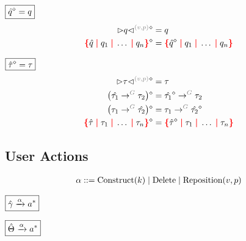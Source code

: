 \noindent $\boxed{\erase{\Z{q}} = q}$
%
\begin{align*}
  \erase{\cursor{v}{p}{q}} &= q \\
  \erase{\conflictHole{\Z{q}, q_1, \ldots, q_n}} &= \conflictHole{\erase{\Z{q}}, q_1, \ldots, q_n}
\end{align*}

\noindent $\boxed{\erase{\Z{\tau}} = \tau}$
%
\begin{align*}
  \erase{\cursor{v}{p}{\tau}} &= \tau \\
  \erase{\left(\tArrow{G}{\Z{\tau_1}}{\tau_2}\right)} &= \tArrow{G}{\erase{\Z{\tau_1}}}{\tau_2} \\
  \erase{\left(\tArrow{G}{\tau_1}{\Z{\tau_2}}\right)} &= \tArrow{G}{\tau_1}{\erase{\Z{\tau_2}}} \\
  \erase{\conflictHole{\Z{\tau}, \tau_1, \ldots, \tau_n}} &= \conflictHole{\erase{\Z{\tau}}, \tau_1, \ldots, \tau_n}
\end{align*}


\subsection{User Actions}

\[
  \arraycolsep=0pt
  \begin{array}{llll}
    \alpha & {}::={} &
      \Construct{k}
      \mid \Delete
      \mid \Reposition{v}{p}
    \\
  \end{array}
\]

\noindent $\boxed{\Z{\Grove} \action{\alpha} a^{*}}$
%
\begin{mathpar}


\end{mathpar}

\noindent $\boxed{\Z{\Set} \action{\alpha} a^{*}}$
%
\begin{mathpar}
\end{mathpar}


